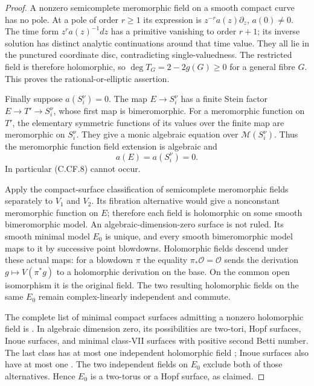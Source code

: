 \begin{proof}
A nonzero semicomplete meromorphic field on a smooth
compact curve has no pole. At a pole of order $r\ge1$
its expression is $z^{-r}a(z)\partial_z$, $a(0)\ne0$.
The time form $z^r a(z)^{-1}dz$ has a primitive
vanishing to order $r+1$; its inverse solution has
distinct analytic continuations around that time
value. They all lie in the punctured coordinate
disc, contradicting single-valuedness. The restricted
field is therefore holomorphic, so
$\deg T_G=2-2g(G)\ge0$ for a general fibre $G$.
This proves the rational-or-elliptic assertion.

Finally suppose $a(S_i^\nu)=0$. The map
$E\to S_i^\nu$ has a finite Stein factor
$E\to T'\to S_i^\nu$, whose first map is
bimeromorphic. For a meromorphic function on $T'$, the
elementary symmetric functions of its values over
the finite map are meromorphic on $S_i^\nu$.
They give a monic algebraic equation over
$\mathcal M(S_i^\nu)$. Thus the meromorphic function
field extension is algebraic and
\[
                            a(E)=a(S_i^\nu)=0.
 \tag{C.CF.9}
\]
In particular (C.CF.8) cannot occur.

Apply the compact-surface classification of semicomplete
meromorphic fields \cite[Theorem~9.2]{Guillot2024}
separately to $V_1$ and $V_2$. Its fibration alternative
would give a nonconstant meromorphic function on $E$;
therefore each field is holomorphic on some smooth
bimeromorphic model. An algebraic-dimension-zero
surface is not ruled. Its smooth minimal model $E_0$
is unique, and every smooth bimeromorphic model maps
to it by successive point blowdowns. Holomorphic
fields descend under these actual maps: for a
blowdown $\pi$ the equality
$\pi_*\mathcal O=\mathcal O$ sends the derivation
$g\mapsto V(\pi^*g)$ to a holomorphic derivation on
the base. On the common open isomorphism it is the
original field. The two resulting holomorphic fields
on the same $E_0$ remain complex-linearly independent
and commute.

The complete list of minimal compact surfaces
admitting a nonzero holomorphic field is
\cite[Theorem~0.3]{DOT2001}. In algebraic dimension
zero, its possibilities are two-tori, Hopf surfaces,
Inoue surfaces, and minimal class-VII surfaces with
positive second Betti number. The last class has
at most one independent holomorphic field
\cite[pp.~256 and~260]{DOT2000}; Inoue surfaces
also have at most one
\cite[Propositions~2(ii), 3(ii) and~5]{Inoue1974}.
The two independent fields on $E_0$ exclude both
of those alternatives. Hence $E_0$ is a two-torus
or a Hopf surface, as claimed.
\end{proof}
